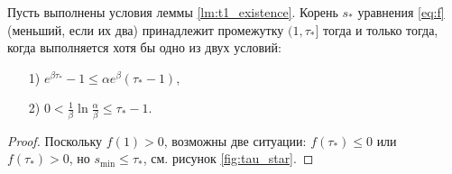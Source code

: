 \begin{lemma}
	\label{lm:t1_locate}
	Пусть выполнены условия леммы \ref{lm:t1_existence}. Корень $s_*$ уравнения \eqref{eq:f} (меньший, если их два) принадлежит промежутку $(1,\tau_*]$ тогда и только тогда, когда выполняется хотя бы одно из двух условий:
	\begin{enumerate}
		\item[1)] $e^{\beta \tau_*} - 1 \leqslant \alpha e^\beta(\tau_* - 1)$,
		\item[2)] $0 < \frac{1}{\beta}\ln\frac{\alpha}{\beta}\leqslant\tau_*-1$.
	\end{enumerate}
\end{lemma}
\begin{proof}
	Поскольку $f(1) > 0$, возможны две ситуации: $f(\tau_*) \leqslant 0$ или $f(\tau_*) > 0$, но $s_{\min} \leq \tau_*$, см. рисунок \ref{fig:tau_star}.


\end{proof}
